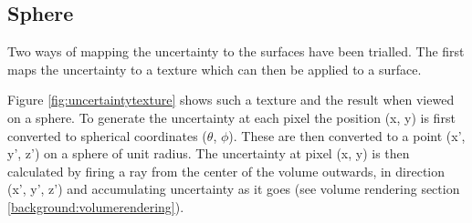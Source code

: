 \subsection*{Sphere}
Two ways of mapping the uncertainty to the surfaces have been trialled. The first maps the uncertainty to a texture which can then be applied to a surface. 

Figure \ref{fig:uncertaintytexture} shows such a texture and the result when viewed on a sphere. To generate the uncertainty at each pixel the position (x, y) is first converted to spherical coordinates ($\theta$, $\phi$). These are then converted to a point (x', y', z') on a sphere of unit radius. The uncertainty at pixel (x, y) is then calculated by firing a ray from the center of the volume outwards, in direction (x', y', z') and accumulating uncertainty as it goes (see volume rendering section \ref{background:volumerendering}).

